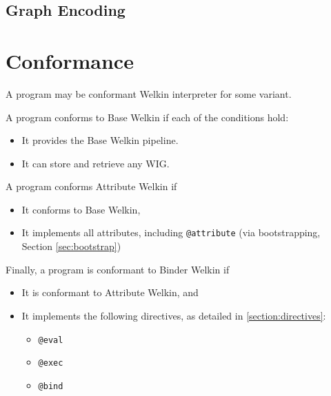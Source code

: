 \subsection{Graph Encoding}

\section{Conformance}
A program may be conformant Welkin interpreter for some variant.

A program conforms to Base Welkin if each of the conditions hold:
\begin{itemize}
  \item It provides the Base Welkin pipeline.
  \item It can store and retrieve any WIG.
\end{itemize}

A program conforms Attribute Welkin if
\begin{itemize}
  \item It conforms to Base Welkin,
  \item It implements all attributes, including \texttt{@attribute} (via bootstrapping, Section \ref{sec:bootstrap})
\end{itemize}


Finally, a program is conformant to Binder Welkin if
\begin{itemize}
  \item It is conformant to Attribute Welkin, and
  \item It implements the following directives, as detailed in \ref{section:directives}:
  \begin{itemize}
    \item \texttt{@eval}
    \item \texttt{@exec}
    \item \texttt{@bind}
  \end{itemize}



\end{itemize}
